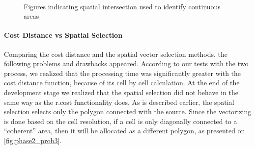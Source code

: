 \begin{figure}[h!]
  \myfloatalign
   \quad
   \\
 \caption{Figures indicating spatial intersection used to identify continuous areas}
 \label{fig:phase2_prob12}
\end{figure}

\paragraph{Cost Distance vs Spatial Selection}

Comparing the cost distance and the spatial vector selection methods, the following problems and drawbacks appeared. According to our tests with the two process, we realized that the processing time was significantly greater with the cost distance function, because of its cell by cell calculation. At the end of the development stage we realized that the spatial selection did not behave in the same way as the r.cost functionality does. As is described earlier, the spatial selection selects only the polygon connected with the source. Since the vectorizing is done based on the cell resolution, if a cell is only diagonally connected to a “coherent” area, then it will be allocated as a different polygon, as presented on \autoref{fig:phase2_prob3}.

